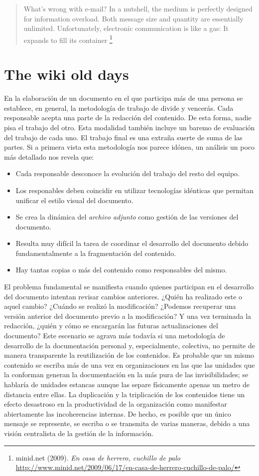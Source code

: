 \documentclass[12pt, a4paper,twoside]{book}
\newcommand{\chap}[1]{\newpage\thispagestyle{empty}\chapter{#1}\label{chap:\thechapter}}
\begin{document}
\begin{quote}
What's wrong with e-mail? In a nutshell, the medium is perfectly
designed for information overload. Both message size and quantity
are essentially unlimited. Unfortunately, electronic communication
is like a gas: It expands to fill its container%
\footnote{minid.net (2009). \emph{En casa de herrero, cuchillo de palo}
\href{http://www.minid.net/2009/06/17/en-casa-de-herrero-cuchillo-de-palo/}{http://www.minid.net/2009/06/17/en-casa-de-herrero-cuchillo-de-palo/}}

\end{quote}
\chap{The wiki old days}

En la elaboración de un documento en el que participa más de una
persona se establece, en general, la metodología de trabajo de
divide y vencerás. Cada responsable acepta una parte de la
redacción del contenido. De esta forma, nadie pisa el trabajo del
otro. Esta modalidad también incluye un baremo de evaluación del
trabajo de cada uno. El trabajo final es una extraña suerte de suma
de las partes. Si a primera vista esta metodología nos parece
idónea, un análisis un poco más detallado nos revela que:

\begin{itemize}
\item
  Cada responsable desconoce la evolución del trabajo del resto del
  equipo.
\item
  Los responables deben coincidir en utilizar tecnologías idénticas
  que permitan unificar el estilo visual del documento.
\item
  Se crea la dinámica del \emph{archivo adjunto} como gestión de las
  versiones del documento.
\item
  Resulta muy difícil la tarea de coordinar el desarrollo del
  documento debido fundamentalmente a la fragmentación del contenido.
\item
  Hay tantas copias o más del contenido como responsables del mismo.
\end{itemize}
El problema fundamental se manifiesta cuando quienes participan en
el desarrollo del documento intentan revisar cambios anteriores.
¿Quién ha realizado este o aquel cambio? ¿Cuándo se realizó la
modificación? ¿Podemos recuperar una versión anterior del documento
previo a la modificación? Y una vez terminada la redacción, ¿quién
y cómo se encargarán las futuras actualizaciones del documento?
Este escenario se agrava más todavía si una metodología de
desarrollo de la documentación personal y, especialmente,
colectiva, no permite de manera transparente la reutilización de
los contenidos. Es probable que un mismo contenido se escriba más
de una vez en organizaciones en las que las unidades que la
conforman generan la documentación en la más pura de las
invisibilidades; se hablaría de unidades estancas aunque las separe
físicamente apenas un metro de distancia entre ellas. La
duplicación y la triplicación de los contenidos tiene un efecto
desastroso en la productividad de la organización como manifestar
abiertamente las incoherencias internas. De hecho, es posible que
un único mensaje se represente, se escriba o se transmita de varias
maneras, debido a una visión centralista de la gestión de la
información.
\end{document}
